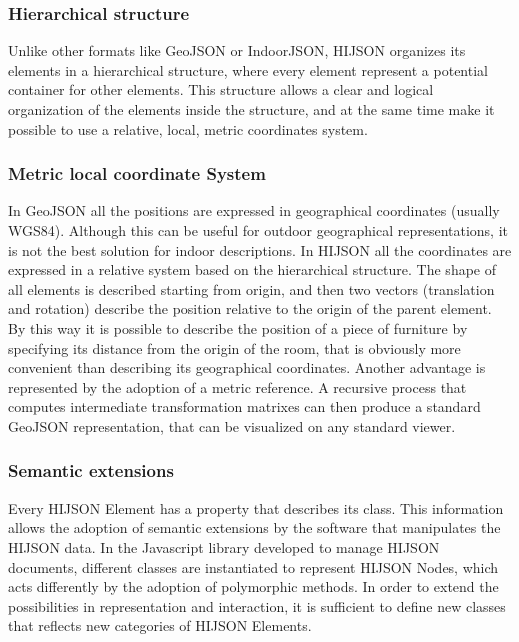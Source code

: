 \documentclass[]{article}
\begin{document}
\subsubsection{Hierarchical structure}\label{hierarchical-structure}

Unlike other formats like GeoJSON or IndoorJSON, HIJSON organizes its
elements in a hierarchical structure, where every element represent a
potential container for other elements. This structure allows a clear
and logical organization of the elements inside the structure, and at
the same time make it possible to use a relative, local, metric
coordinates system.

\subsubsection{Metric local coordinate
System}\label{metric-local-coordinate-system}

In GeoJSON all the positions are expressed in geographical coordinates
(usually WGS84). Although this can be useful for outdoor geographical
representations, it is not the best solution for indoor descriptions. In
HIJSON all the coordinates are expressed in a relative system based on
the hierarchical structure. The shape of all elements is described
starting from origin, and then two vectors (translation and rotation)
describe the position relative to the origin of the parent element. By
this way it is possible to describe the position of a piece of furniture
by specifying its distance from the origin of the room, that is
obviously more convenient than describing its geographical coordinates.
Another advantage is represented by the adoption of a metric reference.
A recursive process that computes intermediate transformation matrixes
can then produce a standard GeoJSON representation, that can be
visualized on any standard viewer.

\subsubsection{Semantic extensions}\label{semantic-extensions}

Every HIJSON Element has a property that describes its class. This
information allows the adoption of semantic extensions by the software
that manipulates the HIJSON data. In the Javascript library developed to
manage HIJSON documents, different classes are instantiated to represent
HIJSON Nodes, which acts differently by the adoption of polymorphic
methods. In order to extend the possibilities in representation and
interaction, it is sufficient to define new classes that reflects new
categories of HIJSON Elements.
\end{document}
